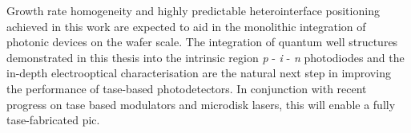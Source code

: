 Growth rate homogeneity and highly predictable heterointerface positioning achieved in this work are expected to aid in the monolithic integration of photonic devices on the wafer scale. The integration of quantum well structures demonstrated in this thesis into the intrinsic region \textit{p} - \textit{i} - \textit{n} photodiodes and the in-depth electrooptical characterisation are the natural next step in improving the performance of \acs{tase}-based photodetectors. In conjunction with recent progress on \acs{tase} based modulators and microdisk lasers, this will enable a fully \acs{tase}-fabricated \acs{pic}.